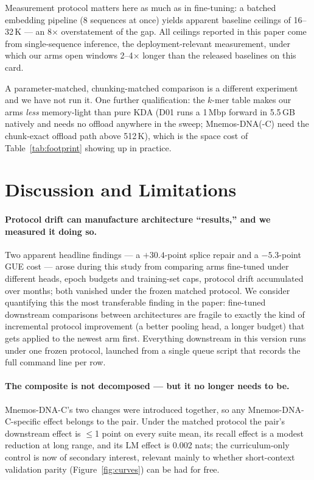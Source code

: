 \documentclass[11pt]{article}
\theoremstyle{plain}
\begin{document}
Measurement protocol matters here as much as in fine-tuning: a batched embedding pipeline (8
sequences at once) yields apparent baseline ceilings of 16--32\,K --- an 8$\times$
overstatement of the gap. All ceilings reported in this paper come from single-sequence
inference, the deployment-relevant measurement, under which our arms open windows
2--4$\times$ longer than the released baselines on this card.

A parameter-matched, chunking-matched comparison is a different experiment and we have not run
it. One further qualification: the $k$-mer table makes our arms \emph{less} memory-light than pure KDA (D01 runs a
1\,Mbp forward in 5.5\,GB natively and needs no offload anywhere in the sweep; Mnemos-DNA(-C)
need the chunk-exact offload path above 512\,K), which
is the space cost of Table~\ref{tab:footprint} showing up in practice.

\FloatBarrier
\section{Discussion and Limitations}\label{sec:disc}

\paragraph{Protocol drift can manufacture architecture ``results,'' and we measured it doing
so.} Two apparent headline findings --- a $+30.4$-point splice repair and a $-5.3$-point
GUE cost --- arose during this study from comparing arms fine-tuned under different heads,
epoch budgets and training-set caps, protocol drift accumulated over months; both vanished
under the frozen matched protocol. We consider
quantifying this the most transferable finding in the paper: fine-tuned downstream comparisons
between architectures are fragile to exactly the kind of incremental protocol improvement
(a better pooling head, a longer budget) that gets applied to the newest arm first. Everything
downstream in this version runs under one frozen protocol, launched from a single queue script
that records the full command line per row.

\paragraph{The composite is not decomposed --- but it no longer needs to be.} Mnemos-DNA-C's two
changes were introduced together, so any Mnemos-DNA-C-specific effect belongs to the pair. Under
the matched protocol the pair's downstream effect is $\le$1 point on every suite mean, its
recall effect is a modest reduction at long range, and its LM effect is 0.002 nats; the
curriculum-only control is now of secondary interest, relevant mainly to whether short-context
validation parity (Figure~\ref{fig:curves}) can be had for free.
\end{document}
